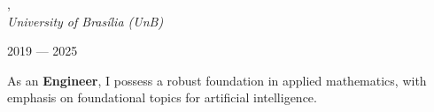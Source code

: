 , \\  
\textit{University of Brasília (UnB)}\strut \hfill 2019 --- 2025\\  

\vspace*{7pt}  

As an \textbf{Engineer}, I possess a robust foundation in applied mathematics, with emphasis on foundational topics for artificial intelligence.  
